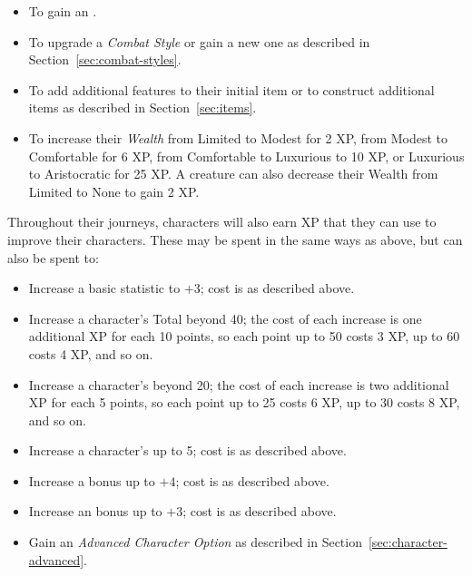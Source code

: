 \begin{itemize}
  \item To gain an \Ability{}.
  \item To upgrade a \emph{Combat Style} or gain a new one as described in Section~\ref{sec:combat-styles}.
  \item To add additional features to their initial item or to construct additional items as described in Section~\ref{sec:items}.
  \item To increase their \emph{Wealth} from Limited to Modest for 2 XP, from Modest to Comfortable for 6 XP, from Comfortable to Luxurious to 10 XP, or Luxurious to Aristocratic for 25 XP. A creature can also decrease their Wealth from Limited to None to gain 2 XP. 
\end{itemize}

Throughout their journeys, characters will also earn XP that they can use to improve their characters.
These may be spent in the same ways as above, but can also be spent to:
\begin{itemize}
  \item Increase a basic statistic to $+3$; cost is as described above.
  \item Increase a character's Total \Life{} beyond 40; the cost of each increase is one additional XP for each 10 points, so each point up to 50 costs 3 XP, up to 60 costs 4 XP, and so on.
  \item Increase a character's \Recovery{} beyond 20; the cost of each increase is two additional XP for each 5 points, so each point up to 25 costs 6 XP, up to 30 costs 8 XP, and so on.
  \item Increase a character's \Block{} up to 5; cost is as described above.
  \item Increase a \Specialization{} bonus up to $+4$; cost is as described above.
  \item Increase an \Experience{} bonus up to $+3$; cost is as described above.
  \item Gain an \emph{Advanced Character Option} as described in Section~\ref{sec:character-advanced}.
\end{itemize}
